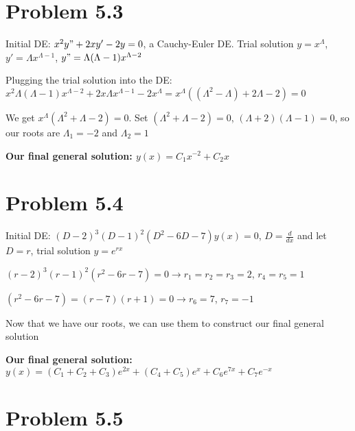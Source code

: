 \documentclass{article}
\begin{document}
\section{Problem 5.3}

Initial DE: $x^{2}y" + 2xy' - 2y = 0$, a Cauchy-Euler DE.  Trial solution $y = x^{\Lambda}$, $y' = \Lambda x^{\Lambda - 1}$, $y" = \Lambda (\Lambda - 1)x^{\Lambda - 2}$ \par\vspace{0.25cm}

\noindent Plugging the trial solution into the DE: $x^{2}\Lambda (\Lambda - 1)x^{\Lambda - 2} + 2x\Lambda x^{\Lambda - 1} - 2x^{\Lambda} = x^{\Lambda}((\Lambda ^{2} - \Lambda) + 2\Lambda - 2) = 0$ \par

\noindent We get $x^{\Lambda}(\Lambda ^{2} + \Lambda - 2) = 0$.  Set $(\Lambda ^{2} + \Lambda - 2) = 0$, $(\Lambda + 2)(\Lambda - 1) = 0$, so our roots are $\Lambda_{1} = -2$ and $\Lambda_{2} = 1$ \par\vspace{0.25cm}

\noindent \textbf{Our final general solution: $y(x) = C_{1}x^{-2} + C_{2}x$}

\section{Problem 5.4}

Initial DE: $(D - 2)^{3}(D - 1)^{2}(D^{2} - 6D - 7)y(x) = 0$, $D = \frac{d}{dx}$ and let $D = r$, trial solution $y = e^{rx}$ \par\vspace{0.25cm}

\noindent $(r - 2)^{3}(r - 1)^{2}(r^{2} - 6r - 7) = 0 \rightarrow r_{1} = r_{2} = r_{3} = 2$, $r_{4} = r_{5} = 1$ \par
\noindent $(r^{2} - 6r - 7) = (r - 7)(r + 1) = 0 \rightarrow r_{6} = 7$, $r_{7} = -1$ \par\vspace{0.25cm}

\noindent Now that we have our roots, we can use them to construct our final general solution \par
\noindent \textbf{Our final general solution: $y(x) = (C_{1} + C_{2} + C_{3})e^{2x} + (C_{4} + C_{5})e^{x} + C_{6}e^{7x} + C_{7}e^{-x}$}

\section{Problem 5.5}
\end{document}
